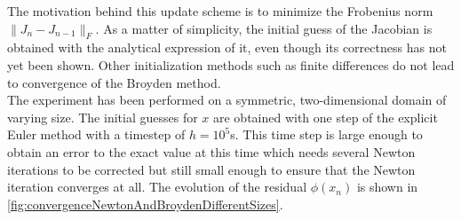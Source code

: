 The motivation behind this update scheme is to minimize the Frobenius norm $\|J_n - J_{n-1}\|_F$. As a matter of simplicity, the initial guess of the Jacobian is obtained with the analytical expression of it, even though its correctness has not yet been shown. Other initialization methods such as finite differences do not lead to convergence of the Broyden method. \\
The experiment has been performed on a symmetric, two-dimensional domain of varying size. The initial guesses for $x$ are obtained with one step of the explicit Euler method with a timestep of $h = 10^5$s. This time step is large enough to obtain an error to the exact value at this time which needs several Newton iterations to be corrected but still small enough to ensure that the Newton iteration converges at all. The evolution of the residual $\phi(x_n)$ is shown in \autoref{fig:convergenceNewtonAndBroydenDifferentSizes}.
